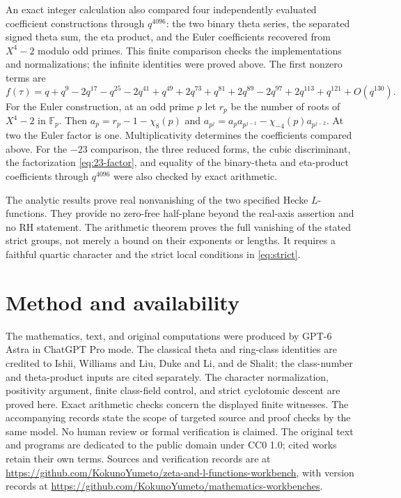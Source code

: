 \documentclass[11pt]{article}
\newcommand{\F}{\mathbb F}
\newcommand{\workbenchurl}{https://github.com/KokunoYumeto/zeta-and-l-functions-workbench}
\newcommand{\recordurl}{https://github.com/KokunoYumeto/mathematics-workbenches}
\begin{document}
An exact integer calculation also compared four independently evaluated
coefficient constructions through $q^{4096}$: the two binary theta
series, the separated signed theta sum, the eta product, and the Euler
coefficients recovered from $X^4-2$ modulo odd primes. This finite
comparison checks the implementations and normalizations; the infinite
identities were proved above. The first nonzero terms are
\[
 f(\tau)=q+q^9-2q^{17}-q^{25}-2q^{41}+q^{49}
          +2q^{73}+q^{81}+2q^{89}-2q^{97}
          +2q^{113}+q^{121}+O(q^{130}).
 \tag{31}\label{eq:first-coefficients}
\]
For the Euler construction, at an odd prime $p$ let $r_p$ be the number
of roots of $X^4-2$ in $\F_p$. Then
$a_p=r_p-1-\chi_8(p)$ and
$a_{p^j}=a_pa_{p^{j-1}}-\chi_{-4}(p)a_{p^{j-2}}$.
At two the Euler factor is one. Multiplicativity determines the
coefficients compared above.
For the $-23$ comparison, the three reduced forms, the cubic
discriminant, the factorization \eqref{eq:23-factor}, and equality of
the binary-theta and eta-product coefficients through $q^{4096}$ were
also checked by exact arithmetic.

The analytic results prove real nonvanishing of the two specified Hecke
$L$-functions. They provide no zero-free half-plane beyond the real-axis
assertion and no RH statement. The arithmetic theorem proves the full
vanishing of the stated strict groups, not merely a bound on their
exponents or lengths. It requires a faithful quartic character and
the strict local conditions in \eqref{eq:strict}.

\section*{Method and availability}
The mathematics, text, and original computations were produced by GPT-6
Astra in ChatGPT Pro mode. The classical theta and ring-class identities
are credited to Ishii, Williams and Liu, Duke and Li, and de Shalit;
the class-number and theta-product inputs are cited separately.
The character normalization, positivity argument, finite class-field
control, and strict cyclotomic descent are proved here. Exact arithmetic
checks concern the displayed finite witnesses. The accompanying records
state the scope of targeted source and proof checks by the same model.
No human review or formal verification is claimed.
The original text and programs are dedicated to the public domain under
CC0 1.0; cited works retain their own terms. Sources and verification
records are at \url{\workbenchurl}, with version records at
\url{\recordurl}.
\end{document}
